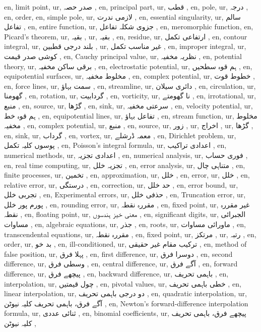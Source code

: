 en, limit point,
ur, صدر حصہ ,
en, principal part,
ur, قطب ,
en, pole,
ur, درجہ ,
en, order,
en, simple pole,
ur, لازمی ندرت ,
en, essential singularity,
ur, سالم تفاعل ,
en, entire function,
ur, جزوی شکلہ تفاعل ,
en, meromorphic function,
en, Picard's theorem,
ur, بقیہ ,
ur, بقیہ ,
en, residue,
ur, ارتفاعی تکمل ,
en, contour integral,
ur, بلند درجی قطبین ,
ur, غیر مناسب تکمل ,
en, improper integral,
ur, کوشی صدر قیمت ,
en, Cauchy principal value,
ur, نظریہ مخفیہ ,
en, potential theory,
ur, برقی ساکن مخفیہ ,
en, electrostatic potential,
ur, ہم قوہ سطحیں ,
en, equipotential surfaces,
ur, مخلوط مخفیہ ,
en, complex potential,
ur, خطوط قوت ,
en, force lines,
ur, سمت بہاؤ ,
en, streamline,
ur, دائری سیلان ,
en, circulation,
ur, گھومنا ,
en, rotation,
ur, گردابیت ,
en, vorticity,
ur, نا گھومتے ,
en, irrotational,
ur, منبع ,
en, source,
ur, گڑھا ,
en, sink,
ur, سرعتی مخفیہ ,
en, velocity potential,
ur, ہم قوہ خط ,
en, equipotential lines,
ur, تفاعل بہاؤ ,
en, stream function,
ur, مخلوط مخفیہ ,
en, complex potential,
ur, منبع ,
en, source,
ur, زور ,
ur, اخراج ,
ur, گڑھا ,
en, sink,
ur, گرداب ,
en, vortex,
ur, معمہ ڈرشلے ,
en, Dirichlet problem,
ur, پوسوں کلیہ تکمل ,
en, Poisson's integral formula,
ur, اعدادی تراکیب ,
en, numerical methods,
ur, اعدادی تجزیہ ,
en, numerical analysis,
ur, فوری حساب ,
en, real time computing,
ur, تجزیہ خلل ,
en, error analysis,
ur, متناہی چال ,
en, finite processes,
ur, تخمین ,
en, approximation,
ur, خلل ,
en, error,
ur,  خلل ,
en, relative error,
ur, درستگی ,
en, correction,
ur, حد خلل ,
en, error bound,
ur, تجربی خلل ,
en, Experimental errors,
ur, حذفی خلل ,
en, Truncation error,
ur, پورم پور خلل ,
en, rounding error,
ur, مقررہ نقطہ ,
en, fixed point,
ur, غیر مقررہ نقطہ ,
en, floating point,
ur, معنی خیز ہندسوں ,
en, significant digits,
ur, الجبرائی مساوات ,
en, algebraic equations,
ur, جذر ,
en, roots,
ur, ماورائی مساوات ,
en, transcendental equations,
ur, مقررہ نقطہ ,
en, fixed point,
ur, مرتکز ,
ur, رتبہ ,
en, order,
ur, بد خو ,
en, ill-conditioned,
ur, ترکیب مقام غیر حقیقی ,
en, method of false position,
ur, پہلا فرق ,
en, first difference,
ur, دوسرا فرق ,
en, second difference,
ur, وسطی فرق ,
en, central difference,
ur, آگے فرق ,
en, forward difference,
ur, پیچھے فرق ,
en, backward difference,
ur, باہمی تحریف ,
en, interpolation,
ur, چول قیمتیں ,
en, pivotal values,
ur, خطی باہمی تحریف ,
en, linear interpolation,
ur, دو درجی باہمی تحریف ,
en, quadratic interpolation,
ur, آگے فرق، باہمی تحریف کلیہ نیوٹن ,
en, Newton's forward-difference interpolation formula,
ur, ثنائی عددی ,
en, binomial coefficients,
ur, پیچھے فرق، باہمی تحریف کلیہ نیوٹن ,
